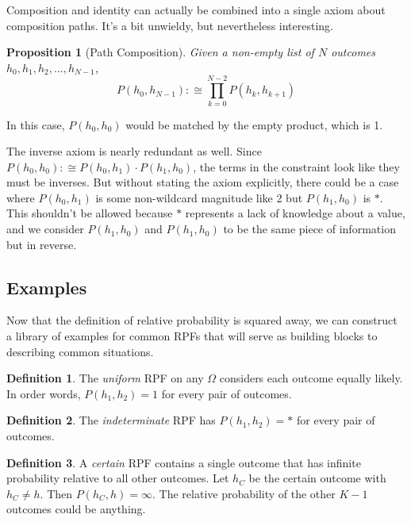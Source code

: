 \documentclass[twoside]{article}
\theoremstyle{plain}%
\newtheorem{proposition}[theorem]{Proposition}
\theoremstyle{definition}
\newtheorem{definition}{Definition}[section]
\theoremstyle{remark}
\begin{document}
Composition and identity can actually be combined into a single axiom about composition paths. It's a bit unwieldy, but nevertheless interesting.

\begin{proposition}[Path Composition]
Given a non-empty list of \(N\) outcomes \(h_0, h_1, h_2, ..., h_{N-1}\), \[P(h_0, h_{N-1}) :\cong \prod_{k=0}^{N-2} P(h_k, h_{k+1}) \]
\end{proposition}

In this case, \(P(h_0, h_0)\) would be matched by the empty product, which is 1.

The inverse axiom is nearly redundant as well. Since \(P(h_0, h_0) :\cong P(h_0, h_1) \cdot P(h_1, h_0)\), the terms in the constraint look like they must be inverses. But without stating the axiom explicitly, there could be a case where \(P(h_0, h_1)\) is some non-wildcard magnitude like 2 but \(P(h_1, h_0)\) is \(\ast\). This shouldn't be allowed because \(\ast\) represents a lack of knowledge about a value, and we consider \(P(h_1, h_0)\) and \(P(h_1, h_0)\) to be the same piece of information but in reverse.

\subsection{Examples}

Now that the definition of relative probability is squared away, we can construct a library of examples for common RPFs that will serve as building blocks to describing common situations.

\begin{definition}
\label{def:uniform_rpf}
The \textit{uniform} RPF on any \(\Omega\) considers each outcome equally likely. In order words, \(P(h_1, h_2) = 1\) for every pair of outcomes.
\end{definition}

\begin{definition}
\label{def:indeterminate_rpf}
The \textit{indeterminate} RPF has \(P(h_1, h_2) = \ast\) for every pair of outcomes.
\end{definition}

\begin{definition}
A \textit{certain} RPF contains a single outcome that has infinite probability relative to all other outcomes. Let \(h_C\) be the certain outcome with \(h_C \neq h\). Then \(P(h_C, h) = \infty\). The relative probability of the other \(K-1\) outcomes could be anything.
\end{definition}
\end{document}
